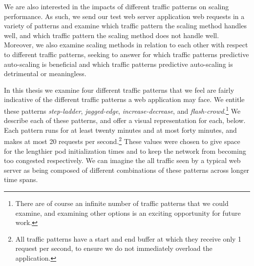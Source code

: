 We are also interested in the impacts of different traffic patterns on scaling
performance. As such, we send our test web server application web requests in a
variety of patterns and examine which traffic pattern the scaling method handles
well, and which traffic pattern the scaling method does not handle well.
Moreover, we also examine scaling methods in relation to each other with respect
to different traffic patterns, seeking to answer for which traffic patterns
predictive auto-scaling is beneficial and which traffic patterns predictive
auto-scaling is detrimental or meaningless.

In this thesis we examine four different traffic patterns that we feel are
fairly indicative of the different traffic patterns a web application may face.
We entitle these patterns \textit{step-ladder}, \textit{jagged-edge},
\textit{increase-decrease}, and
\textit{flash-crowd}.\footnote{There are of course an infinite number of traffic
patterns that we could examine, and examining other options is an exciting
opportunity for future work.} We describe each of these patterns, and offer a
visual representation for each, below. Each pattern runs for at least twenty
minutes and at most forty minutes, and makes at most 20 requests per second.\footnote{All
traffic patterns have a start and end buffer at which they receive
only 1 request per second, to ensure we do not immediately overload the
application.} These values were chosen to give
space for the lengthier pod initialization times and to keep the network from
becoming too congested respectively. We can imagine the all traffic seen by a
typical web server as being composed of different combinations of these patterns
across longer time spans.

